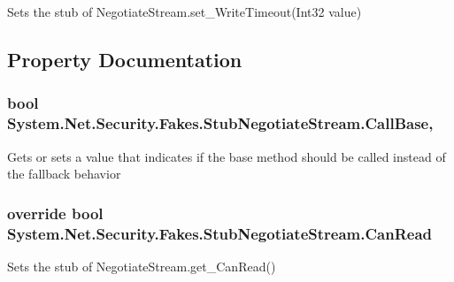 Sets the stub of Negotiate\-Stream.\-set\-\_\-\-Write\-Timeout(\-Int32 value)



\subsection{Property Documentation}
\hypertarget{class_system_1_1_net_1_1_security_1_1_fakes_1_1_stub_negotiate_stream_ab81b626b6aff6f037a8daaaab26b4709}{
\subsubsection[{Call\-Base}]{\setlength{\rightskip}{0pt plus 5cm}bool System.\-Net.\-Security.\-Fakes.\-Stub\-Negotiate\-Stream.\-Call\-Base\hspace{0.3cm}{\ttfamily [get]}, {\ttfamily [set]}}}\label{class_system_1_1_net_1_1_security_1_1_fakes_1_1_stub_negotiate_stream_ab81b626b6aff6f037a8daaaab26b4709}


Gets or sets a value that indicates if the base method should be called instead of the fallback behavior

\hypertarget{class_system_1_1_net_1_1_security_1_1_fakes_1_1_stub_negotiate_stream_a28d799ad0be97c18df065ef4b9f52169}{
\subsubsection[{Can\-Read}]{\setlength{\rightskip}{0pt plus 5cm}override bool System.\-Net.\-Security.\-Fakes.\-Stub\-Negotiate\-Stream.\-Can\-Read\hspace{0.3cm}{\ttfamily [get]}}}\label{class_system_1_1_net_1_1_security_1_1_fakes_1_1_stub_negotiate_stream_a28d799ad0be97c18df065ef4b9f52169}


Sets the stub of Negotiate\-Stream.\-get\-\_\-\-Can\-Read()

